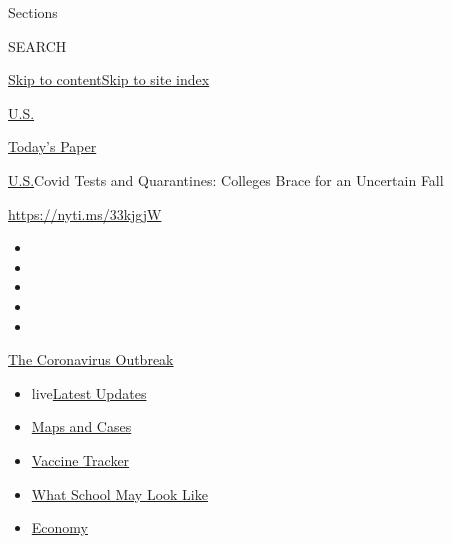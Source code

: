 Sections

SEARCH

\protect\hyperlink{site-content}{Skip to
content}\protect\hyperlink{site-index}{Skip to site index}

\href{https://www.nytimes.com/section/us}{U.S.}

\href{https://myaccount.nytimes.com/auth/login?response_type=cookie\&client_id=vi}{}

\href{https://www.nytimes.com/section/todayspaper}{Today's Paper}

\href{/section/us}{U.S.}\textbar{}Covid Tests and Quarantines: Colleges
Brace for an Uncertain Fall

\url{https://nyti.ms/33kjgjW}

\begin{itemize}
\item
\item
\item
\item
\item
\end{itemize}

\href{https://www.nytimes.com/news-event/coronavirus?action=click\&pgtype=Article\&state=default\&region=TOP_BANNER\&context=storylines_menu}{The
Coronavirus Outbreak}

\begin{itemize}
\tightlist
\item
  live\href{https://www.nytimes.com/2020/08/02/world/coronavirus-updates.html?action=click\&pgtype=Article\&state=default\&region=TOP_BANNER\&context=storylines_menu}{Latest
  Updates}
\item
  \href{https://www.nytimes.com/interactive/2020/us/coronavirus-us-cases.html?action=click\&pgtype=Article\&state=default\&region=TOP_BANNER\&context=storylines_menu}{Maps
  and Cases}
\item
  \href{https://www.nytimes.com/interactive/2020/science/coronavirus-vaccine-tracker.html?action=click\&pgtype=Article\&state=default\&region=TOP_BANNER\&context=storylines_menu}{Vaccine
  Tracker}
\item
  \href{https://www.nytimes.com/interactive/2020/07/29/us/schools-reopening-coronavirus.html?action=click\&pgtype=Article\&state=default\&region=TOP_BANNER\&context=storylines_menu}{What
  School May Look Like}
\item
  \href{https://www.nytimes.com/live/2020/07/31/business/stock-market-today-coronavirus?action=click\&pgtype=Article\&state=default\&region=TOP_BANNER\&context=storylines_menu}{Economy}
\end{itemize}

